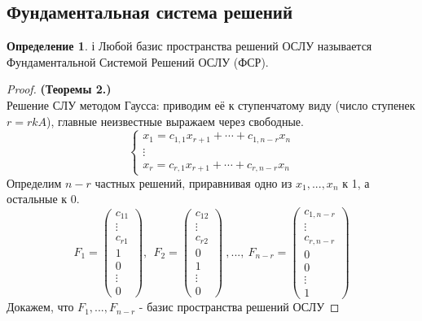 \documentclass[a4paper, 12pt]{article}
\theoremstyle{definition}
\newtheorem*{definition}{Определение}
\begin{document}
  \subsection{Фундаментальная система решений}
  \begin{definition}і
    Любой базис пространства решений ОСЛУ называется \\ Фундаментальной Системой Решений ОСЛУ (ФСР).
  \end{definition} 
  \begin{proof}
    \textbf{(Теоремы 2.)}  \\ Решение СЛУ методом Гаусса: приводим её к ступенчатому виду (число ступенек $r=rkA$), главные неизвестные выражаем через свободные. 
    $$\begin{cases}
      x_1=c_{1,1}x_{r+1} + \cdots + c_{1,n-r}x_n \\
      \vdots\\
      x_r=c_{r,1}x_{r+1} + \cdots + c_{r,n-r}x_n
    \end{cases}$$ 
    Определим $n-r$ частных решений, приравнивая одно из $x_1,...,x_n$ к 1, а остальные к 0. 
    $$F_1 = \begin{pmatrix}
      c_{11}\\
      \vdots\\
      c_{r1}\\
      \hline
      1\\
      0\\
      \vdots\\
      0
    \end{pmatrix}, \ \ F_2 = \begin{pmatrix}
      c_{12}\\
      \vdots\\
      c_{r2}\\
      \hline
      0\\
      1\\
      \vdots\\
      0
    \end{pmatrix} \ ,..., \ F_{n-r} = \begin{pmatrix}
      c_{1,{n-r}}\\
      \vdots\\
      c_{r,{n-r}}\\
      \hline
      0\\
      0\\
      \vdots\\
      1
    \end{pmatrix}$$  
    Докажем, что $F_1,...,F_{n-r}$ - базис пространства решений ОСЛУ 

\end{proof}
\end{document}
